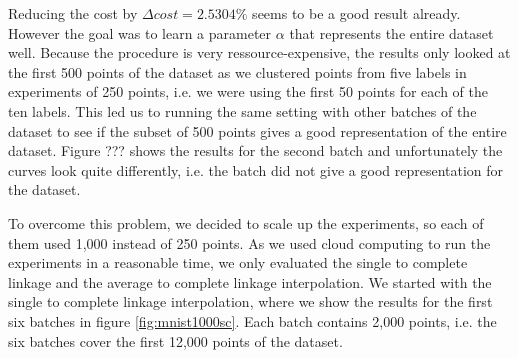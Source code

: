 Reducing the cost by $\Delta cost = 2.5304\%$ seems to be a good result already. However the goal was to learn a parameter $\alpha$ that represents the entire dataset well. Because the procedure is very ressource-expensive, the results only looked at the first 500 points of the dataset as we clustered points from five labels in experiments of 250 points, i.e. we were using the first 50 points for each of the ten labels. This led us to running the same setting with other batches of the dataset to see if the subset of 500 points gives a good representation of the entire dataset. Figure ??? shows the results for the second batch and unfortunately the curves look quite differently, i.e. the batch did not give a good representation for the dataset.

To overcome this problem, we decided to scale up the experiments, so each of them used 1,000 instead of 250 points. As we used cloud computing to run the experiments in a reasonable time, we only evaluated the single to complete linkage and the average to complete linkage interpolation. We started with the single to complete linkage interpolation, where we show the results for the first six batches in figure \ref{fig:mnist1000sc}. Each batch contains 2,000 points, i.e. the six batches cover the first 12,000 points of the dataset.


